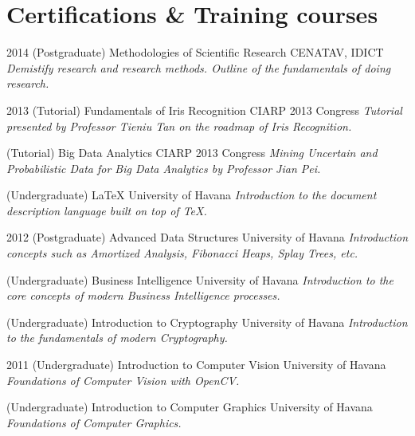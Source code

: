 \documentclass[]{friggeri-cv}
\begin{document}
\section{Certifications \& Training courses}
\begin{entrylist}
  \entry
    {2014}
    {(Postgraduate) Methodologies of Scientific Research}
    {CENATAV, IDICT}
    {\emph{Demistify research and research methods. Outline of the fundamentals of doing research.}}
\end{entrylist}

\begin{entrylist}
  \entry
    {2013}
    {(Tutorial) Fundamentals of Iris Recognition}
    {CIARP 2013 Congress}
    {\emph{Tutorial presented by Professor Tieniu Tan on the roadmap of Iris Recognition.}}

  \entry
    {}
    {(Tutorial) Big Data Analytics}
    {CIARP 2013 Congress}
    {\emph{Mining Uncertain and Probabilistic Data for Big Data Analytics by Professor Jian Pei.}}
    
  \entry
    {}
    {(Undergraduate) \LaTeX}
    {University of Havana}
    {\emph{Introduction to the document description language built on top of \TeX.}}
\end{entrylist}
       
\begin{entrylist}
  \entry
    {2012}
    {(Postgraduate) Advanced Data Structures}
    {University of Havana}
    {\emph{Introduction concepts such as Amortized Analysis, Fibonacci Heaps, Splay Trees, etc.}}      

  \entry
    {}
    {(Undergraduate) Business Intelligence}
    {University of Havana}
    {\emph{Introduction to the core concepts of modern Business Intelligence processes.}}

  \entry
    {}
    {(Undergraduate) Introduction to Cryptography}
    {University of Havana}
    {\emph{Introduction to the fundamentals of modern Cryptography.}}
\end{entrylist}

\begin{entrylist}
  \entry
    {2011}
    {(Undergraduate) Introduction to Computer Vision}
    {University of Havana}
    {\emph{Foundations of Computer Vision with OpenCV.}}

  \entry
    {}
    {(Undergraduate) Introduction to Computer Graphics}
    {University of Havana}
    {\emph{Foundations of Computer Graphics.}}
\end{entrylist}
\end{document}
